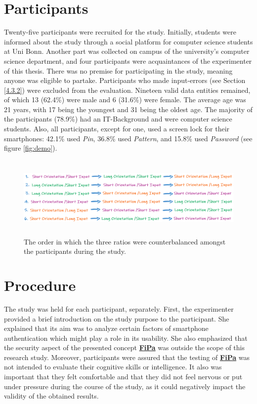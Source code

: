 \section{Participants} \label{5.2}

Twenty-five participants were recruited for the study. Initially, students were informed about the study through a social platform for computer science students at Uni Bonn. Another part was collected on campus of the university's computer science department, and four participants were acquaintances of the experimenter of this thesis. There was no premise for participating in the study, meaning anyone was eligible to partake. Participants who made input-errors (see Section \ref{4.3.2}) were excluded from the evaluation. Nineteen valid data entities remained, of which 13 (62.4\%) were male and 6 (31.6\%) were female. The average age was 21 years, with 17 being the youngest and 31 being the oldest age. The majority of the participants (78.9\%) had an IT-Background and were computer science students. Also, all participants, except for one, used a screen lock for their smartphones: 42.1\% used \textit{Pin}, 36.8\% used \textit{Pattern}, and 15.8\% used \textit{Password} (see figure \ref{fig:demo}). 

\begin{figure}[t!]
\centering
\includegraphics[width=14cm, height=4cm]{Chapters/graphics/permutation.PNG}
\caption{The order in which the three ratios were counterbalanced amongst the participants during the study.}
\label{fig:permutation}
\end{figure}


\section{Procedure} \label{5.3}
The study was held for each participant, separately. First, the experimenter provided a brief introduction on the study purpose to the participant. She explained that its aim was to analyze certain factors of smartphone authentication which might play a role in its usability. She also emphasized that the security aspect of the presented concept \underline{\textbf{FiPa}}  was outside the scope of this research study. Moreover, participants were assured that the testing of \underline{\textbf{FiPa}} was not intended to evaluate their cognitive skills or intelligence. It also was important that they felt comfortable and that they did not feel nervous or put under pressure during the course of the study, as it could negatively impact the validity of the obtained results.\\


